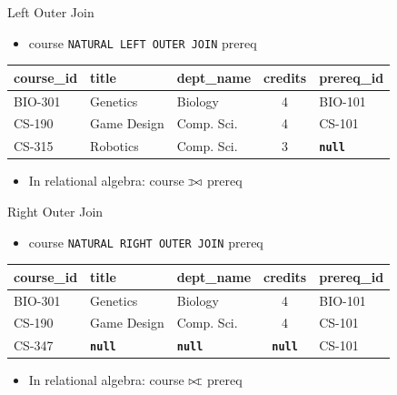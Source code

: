 \documentclass[aspectratio=169]{beamer}
\def\ojoin{\setbox0=\hbox{$\bowtie$}%
  \rule[-.02ex]{.25em}{.4pt}\llap{\rule[\ht0]{.25em}{.4pt}}}
\def\leftouterjoin{\mathbin{\ojoin\mkern-5.8mu\bowtie}}
\def\rightouterjoin{\mathbin{\bowtie\mkern-5.8mu\ojoin}}
\begin{document}
\begin{frame}{Left Outer Join}
    \begin{itemize}
        \item course \texttt{NATURAL LEFT OUTER JOIN} prereq
    \end{itemize}
    \vspace{5mm}
    \begin{tabular}{| l | l | l | c | l |}
        \hline
        \textbf{course\_id} & \textbf{title} & \textbf{dept\_name} & \textbf{credits} & \textbf{prereq\_id} \\
        \hline
        BIO-301 & Genetics    & Biology    & 4 & BIO-101 \\
        \hline
        CS-190  & Game Design & Comp. Sci. & 4 & CS-101  \\
        \hline
        CS-315  & Robotics    & Comp. Sci. & 3 & \textbf{\texttt{null}}\\
        \hline
    \end{tabular}
    \vspace{5mm}
    \begin{itemize}
        \item In relational algebra: course $\leftouterjoin$ prereq
    \end{itemize}
\end{frame}

\begin{frame}{Right Outer Join}
    \begin{itemize}
        \item course \texttt{NATURAL RIGHT OUTER JOIN} prereq
    \end{itemize}
    \vspace{5mm}
    \begin{tabular}{| l | l | l | c | l |}
        \hline
        \textbf{course\_id} & \textbf{title} & \textbf{dept\_name} & \textbf{credits} & \textbf{prereq\_id} \\
        \hline
        BIO-301 & Genetics    & Biology    & 4 & BIO-101 \\
        \hline
        CS-190  & Game Design & Comp. Sci. & 4 & CS-101  \\
        \hline
        CS-347  & \textbf{\texttt{null}}   & \textbf{\texttt{null}} & \textbf{\texttt{null}} & CS-101 \\
        \hline
    \end{tabular}
    \vspace{5mm}
    \begin{itemize}
        \item In relational algebra: course $\rightouterjoin$ prereq
    \end{itemize}
\end{frame}
\end{document}
